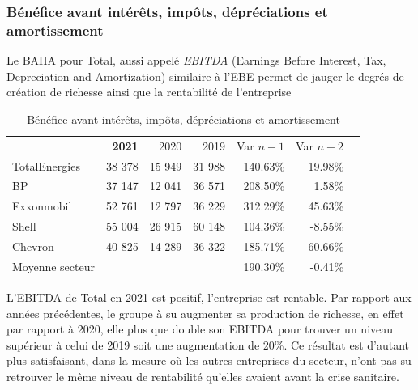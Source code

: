 \documentclass[12pt]{article}
\begin{document}
\subsubsection{Bénéfice avant intérêts, impôts, dépréciations et amortissement}
Le BAIIA pour Total, aussi appelé \textit{EBITDA} (Earnings Before Interest, Tax, Depreciation and Amortization) similaire à l'EBE permet de jauger le degrés de création de richesse ainsi que la rentabilité de l'entreprise
\begin{table}[H]
    \sffamily
    \centering
    \caption{Bénéfice avant intérêts, impôts, dépréciations et amortissement}
    \label{table:EBITDA}
    \begin{tabular}{l*{1}{rrrrrr}}
    \toprule
        ~ & \textbf{2021} & 2020 & 2019 & Var $n-1$ & Var $n-2$ \\
        \cmidrule(r){1-1}\cmidrule(r){2-4}\cmidrule(r){5-6}
        TotalEnergies & 38 378	& 15 949	& 31 988 & 	140.63\% &	19.98\% \\
    \cmidrule(r){1-1}\cmidrule(r){2-4}\cmidrule(r){5-6}
    BP & 37 147 & 12 041 & 36 571 & 208.50\% &	1.58\% \\
    Exxonmobil & 52 761 & 12 797 & 36 229 & 312.29\% &	45.63\% \\
    Shell	& 55 004 &	26 915 &	60 148 &	104.36\% &	-8.55\% \\
    Chevron	& 40 825	& 14 289	& 36 322 & 	185.71\% &	-60.66\% \\
    \cmidrule(r){1-1}\cmidrule(r){2-4}\cmidrule(r){5-6}
        Moyenne secteur	&   ~      &        ~ &    ~	 &	190.30\%	&   -0.41\%  \\
    \bottomrule
    \end{tabular}
\end{table}
L'EBITDA de Total en 2021 est positif, l'entreprise est rentable. Par rapport aux années précédentes, le 
groupe à su augmenter sa production de richesse, en effet par rapport à 2020, elle plus que double son EBITDA pour
trouver un niveau supérieur à celui de 2019 soit une augmentation de 20\%. Ce résultat est d'autant plus  
satisfaisant, dans la mesure où les autres entreprises du secteur, n'ont pas su retrouver le même niveau de
rentabilité qu'elles avaient avant la crise sanitaire.
\end{document}
